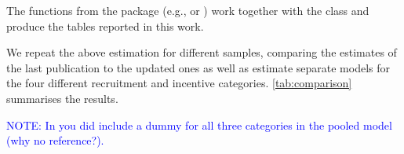 \documentclass[a4paper]{article}\usepackage[]{graphicx}\usepackage[]{xcolor}
\newcommand{\note}[1]{\textcolor{blue}{NOTE: #1}}
\begin{document}
The functions from the  \citep{texreg} package (e.g.,  or ) work together with the class  and produce the tables reported in this work.

We repeat the above estimation for different samples, comparing the estimates of the last publication to the updated ones as well as estimate separate models for the four different recruitment and incentive categories. \cref{tab:comparison} summarises the results.

\note{In \citet{schmid2019predicting} you did include a dummy for all three categories in the pooled model (why no reference?).}




\begin{table}
\caption{Logistic regression results: Regressing response burden score on (logit-transformed) response rates}
\begin{center}
\end{center}
\end{table}
\end{document}
